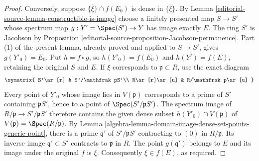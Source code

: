 \begin{proof}
\medskip\noindent
Conversely, suppose $\overline{\{\xi\}}\cap f(E_0)$ is dense
in $\overline{\{\xi\}}$. By Lemma \ref{editorial-source-lemma-constructible-is-image}
choose a finitely presented map $S\to S'$ whose spectrum map
$g:Y'=\Spec(S')\to Y$ has image exactly $E$.
The ring $S'$ is Jacobson by Proposition \ref{editorial-source-proposition-Jacobson-permanence}.
Part (1) of the present lemma, already proved and applied to $S\to S'$,
gives $g(Y'_0)=E_0$. Put $h=f\circ g$, so
$h(Y'_0)=f(E_0)$ and $h(Y')=f(E)$, retaining the original $S$ and $E$.
If $\xi$ corresponds to $\mathfrak p\subset R$, use the exact diagram
$$
\xymatrix{
S'\ar[r] & S'/\mathfrak pS'\\
R\ar[r]\ar[u] & R/\mathfrak p\ar[u]
}
$$
Every point of $Y'_0$ whose image lies in $V(\mathfrak p)$ corresponds
to a prime of $S'$ containing $\mathfrak pS'$, hence to a point of
$\Spec(S'/\mathfrak pS')$. The spectrum image of
$R/\mathfrak p\to S'/\mathfrak pS'$ therefore contains the given
dense subset $h(Y'_0)\cap V(\mathfrak p)$ of
$V(\mathfrak p)=\Spec(R/\mathfrak p)$.
By Lemma \ref{algebra-lemma-domain-image-dense-set-points-generic-point},
there is a prime $\overline{\mathfrak q}'$ of $S'/\mathfrak pS'$
contracting to $(0)$ in $R/\mathfrak p$. Its inverse image
$\mathfrak q'\subset S'$ contracts to $\mathfrak p$ in $R$.
The point $g(\mathfrak q')$ belongs to $E$ and its image under the
original $f$ is $\xi$. Consequently $\xi\in f(E)$, as required.
\end{proof}
